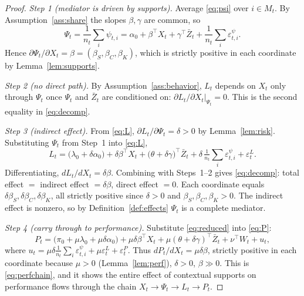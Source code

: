\documentclass{amsart}
\theoremstyle{definition}
\theoremstyle{remark}
\begin{document}
\begin{proof}
\emph{Step 1 (mediator is driven by supports).}
Average \eqref{eq:psi} over $i\in M_t$. By Assumption~\ref{ass:share} the
slopes $\beta,\gamma$ are common, so
\[
\Psi_t=\frac1{n_t}\sum_i\psi_{t,i}
=\alpha_0+\beta^\top X_t+\gamma^\top \bar Z_t
+\frac1{n_t}\sum_i\varepsilon^\psi_{t,i}.
\]
Hence $\partial\Psi_t/\partial X_t=\beta=(\beta_S,\beta_C,\beta_K)$, which
is strictly positive in each coordinate by Lemma~\ref{lem:supports}.

\emph{Step 2 (no direct path).}
By Assumption~\ref{ass:behavior}, $L_t$ depends on $X_t$ only through
$\Psi_t$ once $\Psi_t$ and $\bar Z_t$ are conditioned on:
$\partial L_t/\partial X_t|_{\Psi_t}=0$. This is the second equality in
\eqref{eq:decomp}.

\emph{Step 3 (indirect effect).}
From \eqref{eq:L}, $\partial L_t/\partial\Psi_t=\delta>0$ by
Lemma~\ref{lem:risk}. Substituting $\Psi_t$ from Step~1 into \eqref{eq:L},
\begin{equation}\label{eq:reduced}
L_t=\big(\lambda_0+\delta\alpha_0\big)
+\delta\beta^\top X_t
+\big(\theta+\delta\gamma\big)^\top\bar Z_t
+\delta\,\tfrac1{n_t}\textstyle\sum_i\varepsilon^\psi_{t,i}
+\varepsilon^L_t .
\end{equation}
Differentiating, $dL_t/dX_t=\delta\beta$. Combining with Steps~1--2 gives
\eqref{eq:decomp}: total effect $=$ indirect effect $=\delta\beta$, direct
effect $=0$. Each coordinate equals $\delta\beta_S,\delta\beta_C,
\delta\beta_K$, all strictly positive since $\delta>0$ and
$\beta_S,\beta_C,\beta_K>0$. The indirect effect is nonzero, so by
Definition~\ref{def:effects} $\Psi_t$ is a complete mediator.

\emph{Step 4 (carry through to performance).}
Substitute \eqref{eq:reduced} into \eqref{eq:P}:
\[
P_t=\big(\pi_0+\mu\lambda_0+\mu\delta\alpha_0\big)
+\mu\delta\beta^\top X_t
+\mu(\theta+\delta\gamma)^\top\bar Z_t
+\nu^\top W_t+ u_t,
\]
where $u_t=\mu\delta\frac1{n_t}\sum_i\varepsilon^\psi_{t,i}+\mu\varepsilon^L_t+\varepsilon^P_t$.
Thus $dP_t/dX_t=\mu\delta\beta$, strictly positive in each coordinate
because $\mu>0$ (Lemma~\ref{lem:perf}), $\delta>0$, $\beta\gg 0$. This is
\eqref{eq:perfchain}, and it shows the entire effect of contextual
supports on performance flows through the chain
$X_t\to\Psi_t\to L_t\to P_t$.


\end{proof}
\end{document}

